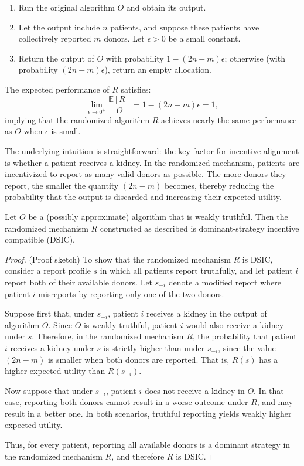\begin{enumerate}
    \item Run the original algorithm $O$ and obtain its output.
    \item Let the output include $n$ patients, and suppose these patients have collectively reported $m$ donors. Let $\epsilon > 0$ be a small constant.
    \item Return the output of $O$ with probability $1 - (2n - m)\epsilon$; otherwise (with probability $(2n - m)\epsilon$), return an empty allocation.
\end{enumerate}

The expected performance of $R$ satisfies:
\[
\lim_{\epsilon \to 0^+} \frac{\mathbb{E}[R]}{O} = 1 - (2n - m)\epsilon = 1,
\]
implying that the randomized algorithm $R$ achieves nearly the same performance as $O$ when $\epsilon$ is small.

The underlying intuition is straightforward: the key factor for incentive alignment is whether a patient receives a kidney. In the randomized mechanism, patients are incentivized to report as many valid donors as possible. The more donors they report, the smaller the quantity $(2n - m)$ becomes, thereby reducing the probability that the output is discarded and increasing their expected utility.

\begin{lemma}
Let $O$ be a (possibly approximate) algorithm that is weakly truthful. Then the randomized mechanism $R$ constructed as described is dominant-strategy incentive compatible (DSIC).
\end{lemma}

\begin{proof}
(Proof sketch) To show that the randomized mechanism $R$ is DSIC, consider a report profile $s$ in which all patients report truthfully, and let patient $i$ report both of their available donors. Let $s_{-i}$ denote a modified report where patient $i$ misreports by reporting only one of the two donors.

Suppose first that, under $s_{-i}$, patient $i$ receives a kidney in the output of algorithm $O$. Since $O$ is weakly truthful, patient $i$ would also receive a kidney under $s$. Therefore, in the randomized mechanism $R$, the probability that patient $i$ receives a kidney under $s$ is strictly higher than under $s_{-i}$, since the value $(2n - m)$ is smaller when both donors are reported. That is, $R(s)$ has a higher expected utility than $R(s_{-i})$.

Now suppose that under $s_{-i}$, patient $i$ does not receive a kidney in $O$. In that case, reporting both donors cannot result in a worse outcome under $R$, and may result in a better one. In both scenarios, truthful reporting yields weakly higher expected utility.

Thus, for every patient, reporting all available donors is a dominant strategy in the randomized mechanism $R$, and therefore $R$ is DSIC.
\end{proof}

